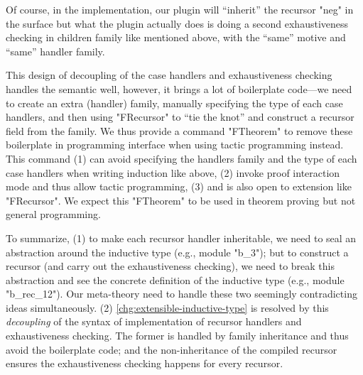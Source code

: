 Of course, in the implementation, our plugin will ``inherit'' the
recursor "neg" in the surface 
but what the plugin actually does is doing a second exhaustiveness
checking in children family like mentioned above, with the ``same'' motive and ``same'' handler family.



 







This design of decoupling of the case handlers and exhaustiveness checking handles the semantic well, however, it brings a lot of boilerplate code---we need to create an extra (handler) family, manually specifying the type of each case handlers, and then using "FRecursor" to ``tie the knot'' and construct a recursor field from the family.  
We thus provide a command "FTheorem" to remove these boilerplate in programming interface when using tactic programming instead. 
This command (1) can avoid specifying the handlers family and the type of each case handlers when writing induction like above, (2) invoke
proof interaction mode and thus allow tactic programming, (3) and is also open to extension like "FRecursor". We expect this "FTheorem" to be used in theorem proving but not general programming. 

To summarize, (1) to make each recursor
handler inheritable, we need to seal an abstraction around the inductive
type (e.g., module "b_3"); but to construct a recursor (and carry out the
exhaustiveness checking), we need to break this abstraction and see the
concrete definition of the inductive type (e.g., module "b_rec_12"). Our
meta-theory need to handle these two seemingly contradicting ideas
simultaneously. (2) \ref{chg:extensible-inductive-type} is resolved by this \textit{decoupling} of the syntax of implementation of recursor handlers and exhaustiveness checking. The former is handled by family inheritance and thus avoid the boilerplate code; and the non-inheritance of the compiled recursor ensures the exhaustiveness checking happens for every recursor.  


